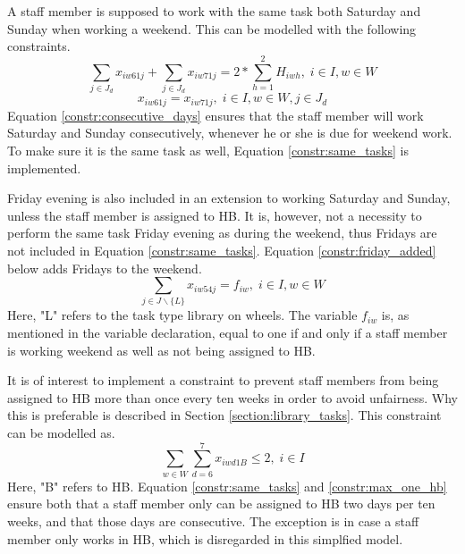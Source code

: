 A staff member is supposed to work with the same task both Saturday and Sunday when working a weekend. This can be modelled with the following constraints.
\begin{equation} \label{constr:consecutive_days}
\sum_{j \in J_d} x_{iw61j} + \sum_{j \in J_d} x_{iw71j} = 2*\sum_{h = 1}^{2} H_{iwh}, \;   i\in I, w \in W
\end{equation}
\begin{equation} \label{constr:same_tasks}
x_{iw61j} = x_{iw71j}, \;   i\in I, w \in W, j \in J_d
\end{equation}
Equation \ref{constr:consecutive_days} ensures that the staff member will work Saturday and Sunday consecutively, whenever he or she is due for weekend work. To make sure it is the same task as well, Equation \ref{constr:same_tasks} is implemented.

Friday evening is also included in an extension to working Saturday and Sunday, unless the staff member is assigned to HB. It is, however, not a necessity to perform the same task Friday evening as during the weekend, thus Fridays are not included in Equation \ref{constr:same_tasks}. Equation \ref{constr:friday_added} below adds Fridays to the weekend.
\begin{equation} \label{constr:friday_added}
\sum_{j \in J \backslash \{L\}}x_{iw54j} = f_{iw}, \;   i \in I, w \in W
\end{equation}
Here, "L" refers to the task type library on wheels. The variable $f_{iw}$ is, as mentioned in the variable declaration, equal to one if and only if a staff member is working weekend as well as not being assigned to HB.

It is of interest to implement a constraint to prevent staff members from being assigned to HB more than once every ten weeks in order to avoid unfairness. Why this is preferable is described in Section \ref{section:library_tasks}. This constraint can be modelled as.
\begin{equation} \label{constr:max_one_hb}
\sum_{w \in W}\sum_{d = 6}^{7}x_{iwd1B} \leq 2, \;   i \in I
\end{equation}
Here, "B" refers to HB. Equation \ref{constr:same_tasks} and \ref{constr:max_one_hb} ensure both that a staff member only can be assigned to HB two days per ten weeks, and that those days are consecutive. The exception is in case a staff member only works in HB, which is disregarded in this simplfied model.

